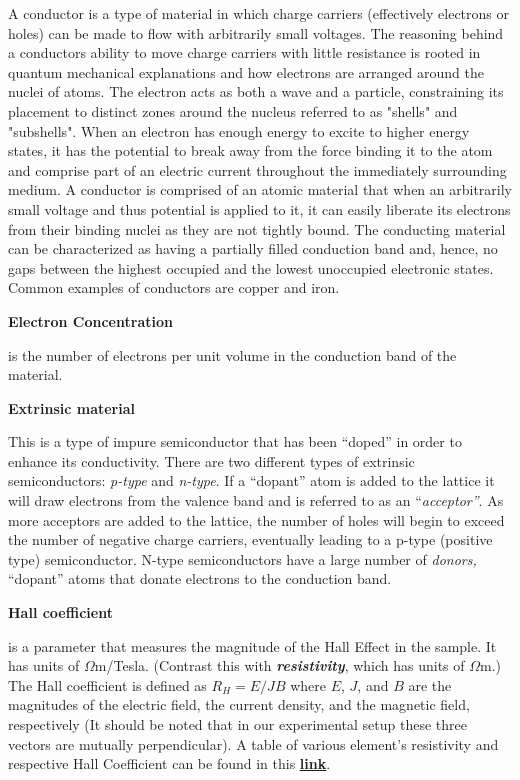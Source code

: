 \documentclass{../lab}
\begin{document}
A conductor is a type of material in which charge carriers (effectively electrons or holes) can be made to flow with arbitrarily small voltages. The reasoning behind a conductors ability to move charge carriers with little resistance is rooted in quantum mechanical explanations and how electrons are arranged around the nuclei of atoms. The electron acts as both a wave and a particle, constraining its placement to distinct zones around the nucleus referred to as "shells" and "subshells". When an electron has enough energy to excite to higher energy states, it has the potential to break away from the force binding it to the atom and comprise part of an electric current throughout the immediately surrounding medium. A conductor is comprised of an atomic material that when an arbitrarily small voltage and thus potential is applied to it, it can easily liberate its electrons from their binding nuclei as they are not tightly bound.  The conducting material can be characterized as having a partially filled conduction band and, hence, no gaps between the highest occupied and the lowest unoccupied electronic states. Common examples of conductors are copper and iron.

\textbf{Electron Concentration}

is the number of electrons per unit volume in the conduction band of the material.

\textbf{Extrinsic material}

This is a type of impure semiconductor that has been ``doped'' in order to enhance its conductivity. There are two different types of extrinsic semiconductors: \emph{p-type} and \emph{n-type}. If a ``dopant'' atom is added to the lattice it will draw electrons from the valence band and is referred to as an ``\emph{acceptor''}. As more acceptors are added to the lattice, the number of holes will begin to exceed the number of negative charge carriers, eventually leading to a p-type (positive type) semiconductor. N-type semiconductors have a large number of\emph{ donors,} ``dopant'' atoms that donate electrons to the conduction band.

\textbf{Hall coefficient}

is a parameter that measures the magnitude of the Hall Effect in the sample. It has units of $\Omega$m/Tesla. (Contrast this with \emph{\textbf{resistivity}}, which has units of $\Omega$m.) The Hall coefficient is defined as $R_{H} = E/JB $  where $E$, $J$, and $B$ are the magnitudes of the electric field, the current density, and the magnetic field, respectively (It should be noted that in our experimental setup these three vectors are mutually perpendicular). A table of various element's resistivity and respective Hall Coefficient can be found in this \href{http://experimentationlab.berkeley.edu/sites/default/files/SHE/tableforRH.png}{\textbf{link}}.
\end{document}
